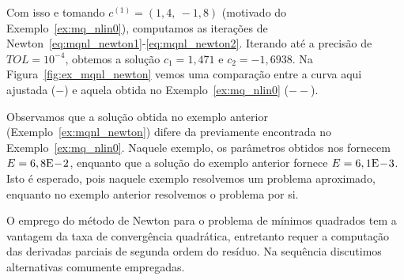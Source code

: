 \begin{ex}
Com isso e tomando $c^{(1)} = (1,4, ~-1,8)$ (motivado do Exemplo~\ref{ex:mq_nlin0}), computamos as iterações de Newton~\eqref{eq:mqnl_newton1}-\eqref{eq:mqnl_newton2}. Iterando até a precisão de $TOL = 10^{-4}$, obtemos a solução $c_1 = 1,471$ e $c_2 = -1,6938$. Na Figura~\ref{fig:ex_mqnl_newton} vemos uma comparação entre a curva aqui ajustada ($-$) e aquela obtida no Exemplo~\ref{ex:mq_nlin0} ($--$).







\end{ex}

Observamos que a solução obtida no exemplo anterior (Exemplo~\ref{ex:mqnl_newton}) difere da previamente encontrada no Exemplo~\ref{ex:mq_nlin0}. Naquele exemplo, os parâmetros obtidos nos fornecem $E = 6,8\mathrm{E}\!-\!2$, enquanto que a solução do exemplo anterior fornece $E = 6,1\mathrm{E}\!-\!3$. Isto é esperado, pois naquele exemplo resolvemos um problema aproximado, enquanto no exemplo anterior resolvemos o problema por si.

O emprego do método de Newton para o problema de mínimos quadrados tem a vantagem da taxa de convergência quadrática, entretanto requer a computação das derivadas parciais de segunda ordem do resíduo. Na sequência discutimos alternativas comumente empregadas.

